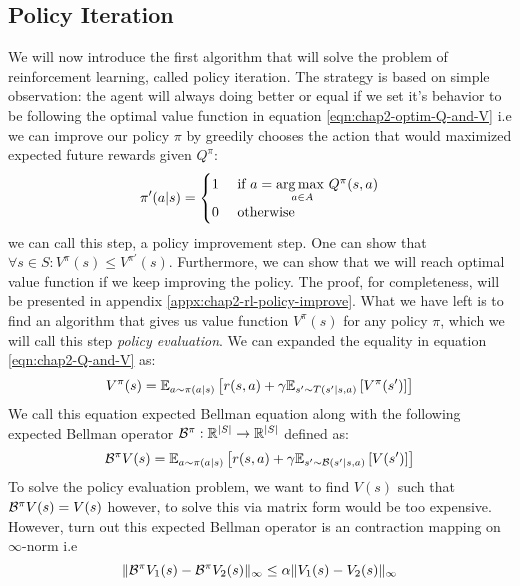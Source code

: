 \subsection{Policy Iteration}
\label{sec:chap2-policy-iter}
We will now introduce the first algorithm that will solve the problem of reinforcement learning, called policy iteration. The strategy is based on simple observation: the agent will always doing better or equal if we set it's behavior to be following the optimal value function in equation \ref{eqn:chap2-optim-Q-and-V} i.e we can improve our policy $\pi$ by greedily chooses the action that would maximized expected future rewards given $Q^\pi$:
\begin{equation}
    \label{eqn:chap2-greedy-Q}
    \pi'(a | s) = \begin{cases}
        1 &\text{ if } a = \underset{a \in A}{\arg\max \ } Q^\pi(s, a) \\
        0 &\text{ otherwise }
    \end{cases}
\end{equation}
we can call this step, a policy improvement step. One can show that $\forall s \in S: V^\pi(s) \le V^{\pi'}(s)$. Furthermore, we can show that we will reach optimal value function if we keep improving the policy. The proof, for completeness, will be presented in appendix \ref{appx:chap2-rl-policy-improve}. What we have left is to find an algorithm that gives us value function $V^{\pi}(s)$ for any policy $\pi$, which we will call this step \textit{policy evaluation}. We can expanded the equality in equation \ref{eqn:chap2-Q-and-V} as:
\begin{equation}
    V^\pi(s) = \mathbb{E}_{a \sim \pi(a | s)} \left[ r(s, a) + \gamma \mathbb{E}_{s' \sim T(s' | s, a)}\left[ V^\pi(s') \right] \right] 
\end{equation}
We call this equation expected Bellman equation along with the following expected Bellman operator $\mathcal{B}^{\pi} : \mathbb{R}^{|S|} \rightarrow \mathbb{R}^{|S|}$ defined as:
\begin{equation}
    \label{eqn:chap2-exp-bellman-operator}
    \mathcal{B}^{\pi} V(s) = \mathbb{E}_{a \sim \pi(a | s)} \left[ r(s, a) + \gamma \mathbb{E}_{s' \sim \mathcal{B}(s' | s, a)}\left[ V(s') \right] \right] 
\end{equation}
To solve the policy evaluation problem, we want to find $V(s)$ such that $\mathcal{B}^\pi V(s) = V(s)$ however, to solve this via matrix form would be too expensive. However, turn out this expected Bellman operator is an contraction mapping on $\infty$-norm i.e 
\begin{equation*}
    \| \mathcal{B}^\pi V_1(s) - \mathcal{B}^\pi V_2(s) \|_\infty \le \alpha \|V_1(s) - V_2(s)\|_\infty
\end{equation*}

